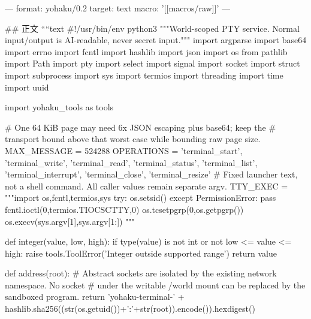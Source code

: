 ---
format: yohaku/0.2
target: text
macro: '[[macros/raw]]'
---

## 正文
````text
#!/usr/bin/env python3
"""World-scoped PTY service. Normal input/output is AI-readable, never secret input."""
import argparse
import base64
import errno
import fcntl
import hashlib
import json
import os
from pathlib import Path
import pty
import select
import signal
import socket
import struct
import subprocess
import sys
import termios
import threading
import time
import uuid

import yohaku_tools as tools

# One 64 KiB page may need 6x JSON escaping plus base64; keep the
# transport bound above that worst case while bounding raw page size.
MAX_MESSAGE = 524288
OPERATIONS = {'terminal_start', 'terminal_write', 'terminal_read', 'terminal_status',
              'terminal_list', 'terminal_interrupt', 'terminal_close', 'terminal_resize'}
# Fixed launcher text, not a shell command. All caller values remain separate argv.
TTY_EXEC = """import os,fcntl,termios,sys
try: os.setsid()
except PermissionError: pass
fcntl.ioctl(0,termios.TIOCSCTTY,0)
os.tcsetpgrp(0,os.getpgrp())
os.execv(sys.argv[1],sys.argv[1:])
"""


def integer(value, low, high):
    if type(value) is not int or not low <= value <= high:
        raise tools.ToolError('Integer outside supported range')
    return value


def address(root):
    # Abstract sockets are isolated by the existing network namespace. No socket
    # under the writable /world mount can be replaced by the sandboxed program.
    return '\0yohaku-terminal-' + hashlib.sha256((str(os.getuid())+':'+str(root)).encode()).hexdigest()


